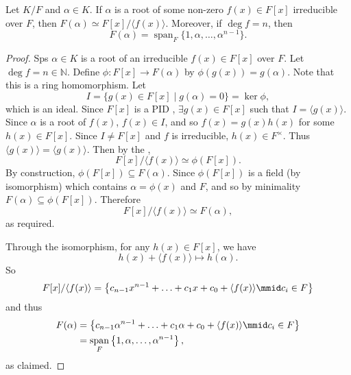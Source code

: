 \documentclass[notoc,notitlepage,nobib]{tufte-book}
\DeclareMathOperator{\Span}{span}
\begin{document}
\begin{propo}\label{propo:span_of_the_extension}
  Let $K / F$ and $\alpha \in K$. If $\alpha$ is a root of some non-zero $f(x)
  \in F[x]$ irreducible over $F$, then $F(\alpha) \simeq F[x] / \langle f(x)
  \rangle$. Moreover, if $\deg f = n$, then
  \begin{equation*}
    F(\alpha) = \Span_F \{ 1, \alpha, \ldots, \alpha^{n - 1} \}.
  \end{equation*}
\end{propo}

\begin{proof}
  Sps $\alpha \in K$ is a root of an irreducible $f(x) \in F[x]$ over $F$. Let
  $\deg f = n \in \mathbb{N}$. Define $\phi : F[x] \to F(\alpha)$ by $\phi(g(x))
  = g(\alpha)$. Note that this is a ring homomorphism. Let
  \begin{equation*}
    I = \{ g(x) \in F[x] \mid g(\alpha) = 0 \} = \ker \phi,
  \end{equation*}
  which is an ideal. Since $F[x]$ is a PID ,
  $\exists g(x) \in F[x]$ such that $I = \langle g(x) \rangle$. Since $\alpha$
  is a root of $f(x)$, $f(x) \in I$, and so $f(x) = g(x) h(x)$ for some $h(x)
  \in F[x]$. Since $I \neq F[x]$ and $f$ is irreducible, $h(x) \in F^\times$.
  Thus $\langle g(x) \rangle = \langle g(x) \rangle$. Then by the ,
  \begin{equation*}
    F[x] / \langle f(x) \rangle \simeq \phi(F[x]).
  \end{equation*}
  By construction, $\phi(F[x]) \subseteq F(\alpha)$. Since $\phi(F[x])$ is a
  field (by isomorphism) which contains $\alpha = \phi(x)$ and $F$, and so by
  minimality $F(\alpha) \subseteq \phi(F[x])$. Therefore
  \begin{equation*}
    F[x]/ \langle f(x) \rangle \simeq F(\alpha),
  \end{equation*}
  as required.

  Through the isomorphism, for any $h(x) \in F[x]$, we have
  \begin{equation*}
    h(x) + \langle f(x) \rangle \mapsto h(\alpha).
  \end{equation*}
  So
  \begin{equation*}
    F[x] / \langle f(x) \rangle 
      = \left\{ c_{n - 1} x^{n - 1} + \hdots + c_1 x + c_0 + \langle f(x)
      \rangle \mmid c_i \in F \right\}
  \end{equation*}
  and thus
  \begin{align*}
    F(\alpha)
      &= \left\{ c_{n - 1} \alpha^{n - 1} + \hdots + c_1 \alpha + c_0 + \langle
        f(x)\rangle \mmid c_i \in F \right\} \\
      &= \Span_F \left\{ 1, \alpha, \ldots, \alpha^{n - 1} \right\},
  \end{align*}
  as claimed.
\end{proof}
\end{document}
